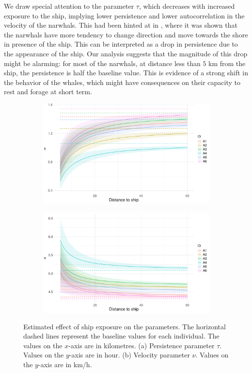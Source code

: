 \documentclass[aoas]{imsart}
\theoremstyle{definition}
\theoremstyle{remark}
\theoremstyle{remark}
\newcommand {\1}{\mathbb{1}}
\begin{document}
We draw special attention to the parameter $\tau$, which decreases with increased exposure to the ship, implying lower persistence and lower autocorrelation in the velocity of the narwhals. This had been hinted at in \citep{heide-jorgensen_behavioral_2021}, where it was shown that the narwhals have more tendency to change direction and move towards the shore in presence of the ship. This can be interpreted as a drop in persistence due to the appearance of the ship. Our analysis suggests that the magnitude of this drop might be alarming: for most of the narwhals, at distance less than $5$ km from the ship, the persistence is half the baseline value. This is evidence of a strong shift in the behavior of the whales, which might have consequences on their capacity to rest and forage at short term.


\begin{figure}[ht!]
	\begin{subfigure}{0.98\textwidth}\centering
		\includegraphics[width=0.7\linewidth]{"images/application/response/plot_me_tau_updated.pdf"}
		\caption{}
	\end{subfigure}
	
	\begin{subfigure}{0.98\textwidth}
		\centering
		\includegraphics[width=0.7\linewidth]{"images/application/response/plot_me_nu_updated.pdf"}
		\caption{}
	\end{subfigure}
	\caption{Estimated effect of ship exposure on the parameters. The horizontal dashed lines represent the baseline values for each individual. The values on the $x$-axis are in kilometres. (a)  Persistence parameter $\tau$. Values on the $y$-axis are in hour. (b) Velocity parameter $\nu$. Values on the $y$-axis are in km/h.}
	\label{fig: me response}
\end{figure}
\end{document}
